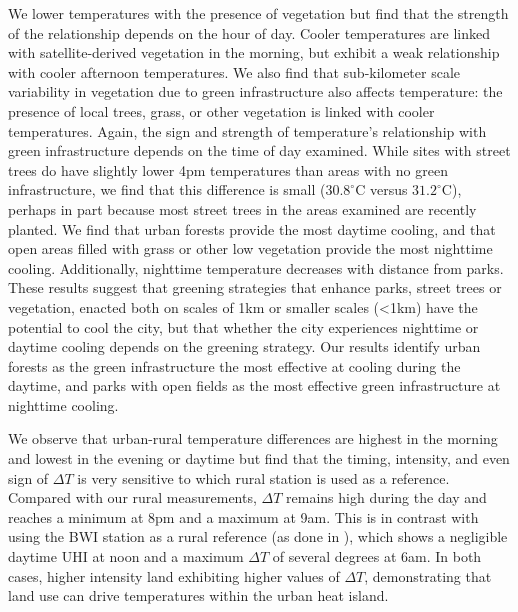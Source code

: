 \documentclass[draft,linenumbers]{agujournal}
\begin{document}
  

We lower temperatures with the presence of vegetation but find that the strength of the relationship depends on the hour of day. Cooler temperatures are linked with satellite-derived vegetation in the morning, but exhibit a weak relationship with cooler afternoon temperatures.  We also find that sub-kilometer scale variability in vegetation due to green infrastructure also affects temperature: the presence of local trees, grass, or other vegetation is linked with cooler temperatures. Again, the sign and strength of temperature's relationship with green infrastructure depends on the time of day examined. While sites with street trees do have slightly lower 4pm temperatures than areas with no green infrastructure, we find that this difference is small ($30.8^\circ$C versus $31.2^\circ$C), perhaps in part because most street trees in the areas examined are recently planted. We find that urban forests provide the most daytime cooling, and that open areas filled with grass or other low vegetation provide the most nighttime cooling. Additionally, nighttime temperature decreases with distance from parks. These results suggest that greening strategies that enhance parks, street trees or vegetation, enacted both on scales of 1km or smaller scales (<1km) have the potential to cool the city, but that whether the city experiences nighttime or daytime cooling depends on the greening strategy. Our results identify urban forests as the green infrastructure the most effective at cooling during the daytime, and parks with open fields as the most effective green infrastructure at nighttime cooling. 

We observe that urban-rural temperature differences are highest in the morning and lowest in the evening or daytime but find that the timing, intensity, and even sign of $\Delta T$ is very sensitive to which rural station is used as a reference. Compared with our rural measurements,  $\Delta T$ remains high during the day and reaches a minimum at 8pm and a maximum at 9am. This is in contrast with using the BWI station as a rural reference (as done in \citep{li2013synergistic}), which shows  a negligible daytime UHI at noon and a maximum $\Delta T$ of several degrees at 6am. In both cases, higher intensity land exhibiting higher values of $\Delta T$, demonstrating that land use can drive temperatures within the urban heat island.
\end{document}
